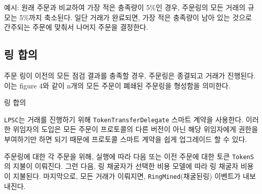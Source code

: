 \documentclass{article}
\makeatletter
\newenvironment{figurehere}
{\def\@captype{figure}}
{}
\makeatother
\begin{document}
\begin{multicols}{2}
예시: 원래 주문과 비교하여 가장 적은 충족량이 5\%인 경우, 주문링의 모든 거래의 규모는 5\%까지 축소된다. 일단 거래가 완료되면, 가장 적은 충족량이 남아 있는 것으로 간주되는 주문에 맞춰서 나머지 주문을 결정한다. 


\subsection{링 합의\label{sec:settlement}}

주문 링이 이전의 모든 점검 결과를 충족할 경우, 주문링은 종결되고 거래가 진행된다. 이는 figure 4와 같이 n개의 모든 주문이 폐쇄된 주문링을 형성함을 의미한다.

\begin{center}
	\begin{figurehere}
		\centering
		
	\caption{링 합의}
	\label{fig:settlement}
	\end{figurehere}
\end{center}

\verb|LPSC|는 거래를 진행하기 위해 \verb|TokenTransferDelegate| 스마트 계약을 사용한다. 이러한 위임자의 도입은 모든 주문이 프로토콜의 다른 버전이 아닌 해당 위임자에게 권한을 부여하기만 하면 되기 때문에 프로토콜 스마트 계약을 쉽게 업그레이드 할 수 있다.

주문링에 대한 각 주문을 위해, 실행에 따라 다음 또는 이전 주문에 대한 토큰 \verb|TokenS|의 지불이 이뤄진다. 그런 다음, 링 채굴자가 선택한 비용 모델에 따라 링 채굴자 비용이 지불된다. 마지막으로, 모든 거래가 이뤄지면, \verb|RingMined|(채굴된링) 이벤트가 내보내진다.


\end{multicols}
\end{document}
